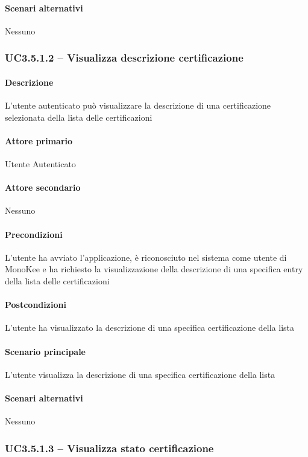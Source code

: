 \paragraph{Scenari alternativi}  Nessuno




\subsubsection{UC3.5.1.2 – Visualizza descrizione certificazione}
\paragraph{Descrizione}  L’utente autenticato può visualizzare la descrizione di una certificazione selezionata della lista delle certificazioni
\paragraph{Attore primario}  Utente Autenticato
\paragraph{Attore secondario}  Nessuno
\paragraph{Precondizioni} L’utente ha avviato l’applicazione, è riconosciuto nel sistema come utente di MonoKee e ha richiesto la visualizzazione della descrizione di una specifica entry della lista delle certificazioni
\paragraph{Postcondizioni}  L’utente ha visualizzato la descrizione di una specifica certificazione della lista
\paragraph{Scenario principale}  
L’utente visualizza la descrizione di una specifica certificazione della lista
\paragraph{Scenari alternativi}  Nessuno



\subsubsection{UC3.5.1.3 – Visualizza stato certificazione}
